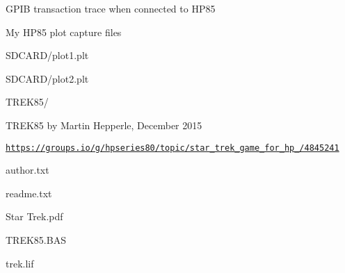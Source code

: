 {\begin{DoxyItemize}
\begin{DoxyItemize}
\begin{DoxyItemize}
\begin{DoxyItemize}
\item G\+P\+IB transaction trace when connected to H\+P85
\end{DoxyItemize}
\end{DoxyItemize}
\item My H\+P85 plot capture files
\begin{DoxyItemize}
\item S\+D\+C\+A\+R\+D/plot1.\+plt
\item S\+D\+C\+A\+R\+D/plot2.\+plt
\end{DoxyItemize}
\item T\+R\+E\+K85/
\begin{DoxyItemize}
\item T\+R\+E\+K85 by Martin Hepperle, December 2015
\item \href{https://groups.io/g/hpseries80/topic/star_trek_game_for_hp_85/4845241}{\tt https\+://groups.\+io/g/hpseries80/topic/star\+\_\+trek\+\_\+game\+\_\+for\+\_\+hp\+\_/4845241}
\begin{DoxyItemize}
\item author.\+txt
\item readme.\+txt
\item Star Trek.\+pdf
\item T\+R\+E\+K85.\+B\+AS
\item trek.\+lif 
\end{DoxyItemize}
\end{DoxyItemize}
\end{DoxyItemize}
\end{DoxyItemize}}